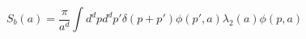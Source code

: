 \begin{equation}
S_b(a)= \frac {\pi} {a^d} \int d^dp d^dp' \delta(p+p') \phi(p',a)
\lambda_2(a) \phi(p,a) \label{braneaction}
\end{equation}


